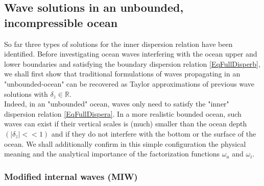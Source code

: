 \documentclass[a4paper,11pt]{article}
\begin{document}

\subsection{Wave solutions in an unbounded, incompressible ocean}
\label{SubSectionUsualDisp}

So far three types of solutions for the inner dispersion relation have been identified. Before investigating ocean waves interfering with the ocean upper and lower boundaries and satisfying the boundary dispersion relation \ref{EqFullDisperb}, we shall first show that traditional formulations of waves propagating in an "unbounded-ocean" can be recovered as Taylor approximations of previous wave solutions with $\delta_z\in\mathbb{R}$.\\
Indeed, in an "unbounded" ocean, waves only need to satisfy the "inner" dispersion relation \ref{EqFullDispera}. In a more realistic bounded ocean, such waves can exist if their vertical scales is (much) smaller than the ocean depth $(|\delta_z| << 1)$ and if they do not interfere with the bottom or the surface of the ocean. 
We shall additionally confirm in this simple configuration the physical meaning and the analytical importance of the factorization functions $\omega_a$ and $\omega_i$. 


\subsubsection{Modified internal waves (MIW)}
\end{document}
